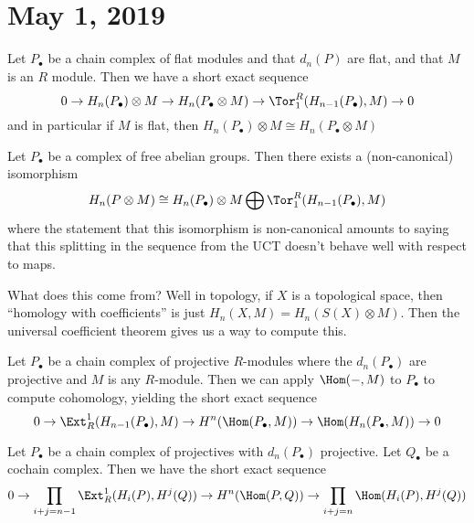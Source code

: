 \documentclass[12pt]{article}
\begin{document}
\section{May 1, 2019}
\begin{cor}
	Let $P_\bullet$ be a chain complex of flat modules and that $d_n(P)$ are flat, and that $M$ is an $R$ module.
	Then we have a short exact sequence
	\[0\to H_n(P_\bullet)\otimes M\to H_n(P_\bullet\otimes M)\to \Tor_1^R(H_{n-1}(P_\bullet),M)\to 0\]
	and in particular if $M$ is flat, then $H_n(P_\bullet)\otimes M\cong H_n(P_\bullet\otimes M)$ 
\end{cor}
\begin{prop}
	Let $P_\bullet$ be a complex of free abelian groups. Then there exists a (non-canonical) isomorphism
	\[H_n(P\otimes M)\cong H_n(P_\bullet)\otimes M\bigoplus \Tor_1^R(H_{n-1}(P_\bullet),M)\]
	where the statement that this isomorphism is non-canonical amounts to saying that this splitting
	in the sequence from the UCT doesn't behave well with respect to maps.
\end{prop}
\begin{rmk}
	What does this come from? Well in topology, if $X$ is a topological space, then ``homology with coefficients''
	is just $H_n(X,M)=H_n(S(X)\otimes M)$. Then the universal coefficient theorem gives us a way to compute this.
\end{rmk}


\begin{prop}
	Let $P_\bullet$ be a chain complex of projective $R$-modules where the $d_n(P_\bullet)$ are projective and
	$M$ is any $R$-module. Then we can apply $\Hom(-,M)$ to $P_\bullet$ to compute cohomology, yielding the short exact sequence
	\[0\to \Ext_R^1(H_{n-1}(P_\bullet),M)\to H^n(\Hom(P_\bullet,M))\to \Hom(H_n(P_\bullet,M))\to 0\]
\end{prop}
\begin{prop}
	Let $P_\bullet$ be a chain complex of projectives with $d_n(P_\bullet)$ projective. Let $Q_\bullet$ be a cochain complex. 
	Then we have the short exact sequence
	\[0\to\prod_{i+j=n-1}\Ext_R^1(H_i(P),H^j(Q))\to H^n(\Hom(P,Q))\to \prod_{i+j=n}\Hom(H_i(P),H^j(Q))\]
\end{prop}
\end{document}
